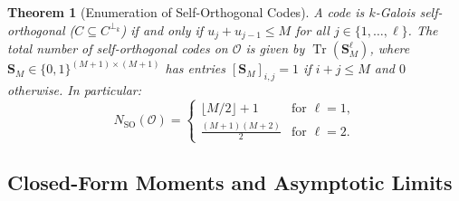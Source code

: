 \documentclass[preprint,12pt]{elsarticle}
\newcommand{\Tr}{\operatorname{Tr}}
\numberwithin{equation}{section}
\theoremstyle{plain}
\newtheorem{theorem}{Theorem}[section]
\theoremstyle{definition}
\theoremstyle{remark}
\begin{document}
\begin{theorem}[Enumeration of Self-Orthogonal Codes]\label{thm:self_orthogonal}
A code is $k$-Galois self-orthogonal ($C \subseteq C^{\perp_k}$) if and only if $u_j + u_{j-1} \le M$ for all $j \in \{1, \dots, \ell\}$. The total number of self-orthogonal codes on $\mathcal{O}$ is given by $\Tr(\mathbf{S}_M^\ell)$, where $\mathbf{S}_M \in \{0, 1\}^{(M+1) \times (M+1)}$ has entries $[\mathbf{S}_M]_{i, j} = 1$ if $i + j \le M$ and $0$ otherwise. In particular:
\begin{equation}
    N_{\mathrm{SO}}(\mathcal{O}) = \begin{cases}
        \lfloor M/2 \rfloor + 1 & \text{for } \ell = 1, \\
        \frac{(M+1)(M+2)}{2} & \text{for } \ell = 2.
    \end{cases}
\end{equation}
\end{theorem}

\subsection{Closed-Form Moments and Asymptotic Limits}
\end{document}

